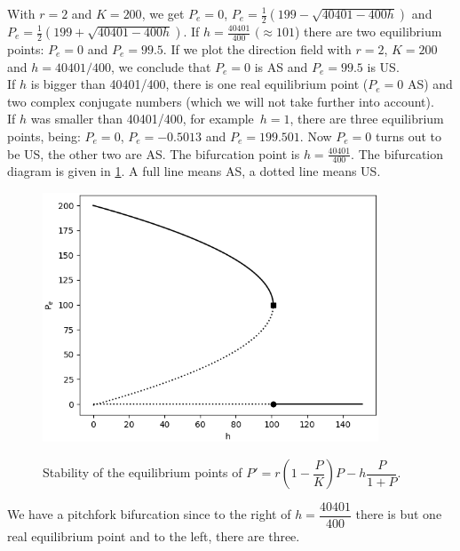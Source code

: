 \begin{Answer}
    \Question With $r = 2$ and $K = 200$, we get $P_e = 0$, $P_e = \frac{1}{2}(199 - \sqrt{40401 - 400h})$ and \\ $P_e = \frac{1}{2}(199 + \sqrt{40401 - 400h})$.
    \Question If $h = \frac{40401}{400}$ $(\approx 101$) there are two equilibrium points: $P_e = 0$ and $P_e = 99.5$. If we plot the direction field with $r = 2$, $K = 200$ and $h = 40401/400$, we conclude that $P_e = 0$ is AS and $P_e = 99.5$ is US.\\
    If $h$ is bigger than 40401/400, there is one real equilibrium point ($P_e = 0$ AS) and two complex conjugate numbers (which we will not take further into account).\\
    If $h$ was smaller than 40401/400, for example\ $h = 1$, there are three equilibrium points, being: $P_e = 0$, $P_e = -0.5013$ and $P_e = 199.501$. Now $P_e = 0$ turns out to be US, the other two are AS. 
    \Question The bifurcation point is $h = \frac{40401}{400}$. The bifurcation diagram is given in \ref{fig:oefening2_4_3_1}. A full line means AS, a dotted line means US.
        
\begin{figure}[H]
	\centering				\includegraphics[width=10cm]{oefening2_4_3_1.png}\\
	\caption{Stability of the equilibrium points of $P' = r\left(1 - \dfrac{P}{K}\right)P-h \dfrac{P}{1+P}$. \label{fig:oefening2_4_3_1}}
\end{figure}

        We have a pitchfork bifurcation since to the right of $h = \dfrac{40401}{400}$ there is but one real equilibrium point and to the left, there are three. 
\end{Answer}


